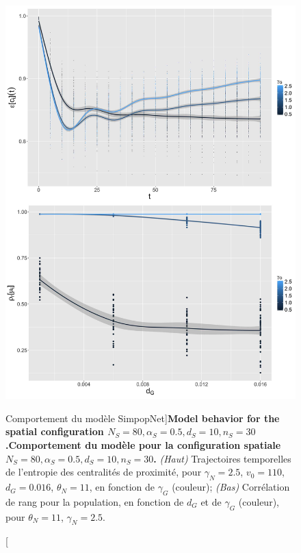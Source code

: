 \begin{figure}
	\includegraphics[width=\linewidth,height=0.85\textheight]{Figures/Final/6-1-3-fig-macrocoevolexplo-behavior.jpg}
	\caption[Model Behavior][Comportement du modèle SimpopNet]{\textbf{Model behavior for the spatial configuration $N_S=80,\alpha_S=0.5,d_S=10,n_S=30$.}\label{fig:macrocoevolexplo:behavior}}{\textbf{Comportement du modèle pour la configuration spatiale $N_S=80,\alpha_S=0.5,d_S=10,n_S=30$.} \textit{(Haut)} Trajectoires temporelles de l'entropie des centralités de proximité, pour $\gamma_N = 2.5$, $v_0 = 110$, $d_G = 0.016$, $\theta_N = 11$, en fonction de $\gamma_G$ (couleur); \textit{(Bas)} Corrélation de rang pour la population, en fonction de $d_G$ et de $\gamma_G$ (couleur), pour $\theta_N = 11$, $\gamma_N = 2.5$.\label{fig:macrocoevolexplo:behavior}}
\end{figure}



